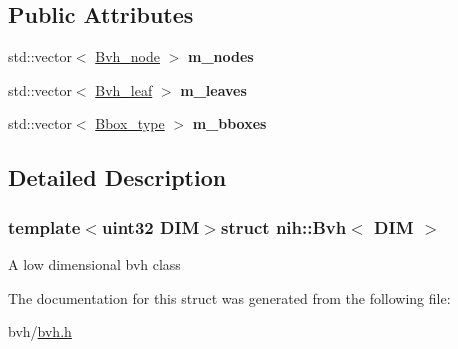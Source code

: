 \subsection*{\-Public \-Attributes}
\begin{DoxyCompactItemize}
\item 
\hypertarget{structnih_1_1_bvh_a6d693413eb1650cea2a33b876196fa3d}{
std\-::vector$<$ \hyperlink{structnih_1_1_bvh__node}{\-Bvh\-\_\-node} $>$ {\bfseries m\-\_\-nodes}}
\label{structnih_1_1_bvh_a6d693413eb1650cea2a33b876196fa3d}

\item 
\hypertarget{structnih_1_1_bvh_a7342b1b0bb29bd01e4e57b2206302be1}{
std\-::vector$<$ \hyperlink{structnih_1_1_bvh__leaf}{\-Bvh\-\_\-leaf} $>$ {\bfseries m\-\_\-leaves}}
\label{structnih_1_1_bvh_a7342b1b0bb29bd01e4e57b2206302be1}

\item 
\hypertarget{structnih_1_1_bvh_a47d320eef626bc51afc989a925cefab4}{
std\-::vector$<$ \hyperlink{structnih_1_1_bbox}{\-Bbox\-\_\-type} $>$ {\bfseries m\-\_\-bboxes}}
\label{structnih_1_1_bvh_a47d320eef626bc51afc989a925cefab4}

\end{DoxyCompactItemize}


\subsection{\-Detailed \-Description}
\subsubsection*{template$<$uint32 \-D\-I\-M$>$struct nih\-::\-Bvh$<$ D\-I\-M $>$}

\-A low dimensional bvh class 

\-The documentation for this struct was generated from the following file\-:\begin{DoxyCompactItemize}
\item 
bvh/\hyperlink{bvh_8h}{bvh.\-h}\end{DoxyCompactItemize}
